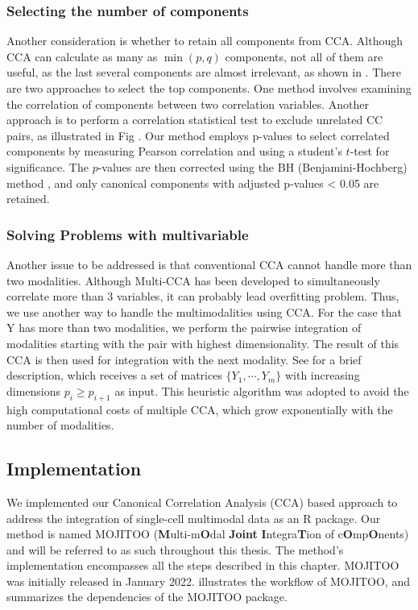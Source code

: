 \subsubsection{Selecting the number of components}
Another consideration is whether to retain all components from CCA. Although CCA can calculate as many as $\min(p, q)$ components, not all of them are useful, as the last several components are almost irrelevant, as shown in . There are two approaches to select the top components. One method involves examining the correlation of components between two correlation variables. Another approach is to perform a correlation statistical test to exclude unrelated CC pairs, as illustrated in Fig . Our method employs p-values to select correlated components by measuring Pearson correlation and using a student's $t$-test for significance. The $p$-values are then corrected using the BH (Benjamini-Hochberg) method \cite{benjamini1995controlling}, and only canonical components with adjusted p-values < 0.05 are retained.

\subsubsection{Solving Problems with multivariable}
Another issue to be addressed is that conventional CCA cannot handle more than two modalities. Although Multi-CCA has been developed to simultaneously correlate more than 3 variables, it can probably lead overfitting problem. Thus, we use another way to handle the multimodalities using CCA. For the case that Y has more than two modalities, we perform the pairwise integration of modalities starting with the pair with highest dimensionality. The result of this CCA is then used for integration
with the next modality. See  for a brief description, which receives a set of matrices $\{Y_{1},\cdots, Y_{m}\}$ with increasing dimensions $p_{i}\geq p_{i+1}$ as input. This heuristic algorithm was adopted to avoid the high computational costs of multiple CCA, which grow exponentially with the number of modalities. 

\subsection{Implementation}
We implemented our Canonical Correlation Analysis (CCA) based approach to address the integration of single-cell multimodal data as an R package. Our method is named MOJITOO (\textbf{M}ulti-m\textbf{O}dal \textbf{Joint} \textbf{I}ntegra\textbf{T}ion of c\textbf{O}mp\textbf{O}nents) and will be referred to as such throughout this thesis. The method's implementation encompasses all the steps described in this chapter. MOJITOO was initially released in January 2022.  illustrates the workflow of MOJITOO, and  summarizes the dependencies of the MOJITOO package.


